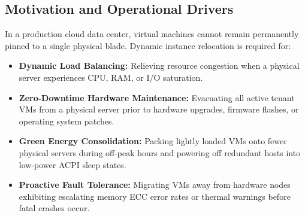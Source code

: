 \subsection{Motivation and Operational Drivers}
In a production cloud data center, virtual machines cannot remain permanently pinned to a single physical blade. Dynamic instance relocation is required for:
\begin{itemize}[leftmargin=*]
  \item \textbf{Dynamic Load Balancing:} Relieving resource congestion when a physical server experiences CPU, RAM, or I/O saturation.
  \item \textbf{Zero-Downtime Hardware Maintenance:} Evacuating all active tenant VMs from a physical server prior to hardware upgrades, firmware flashes, or operating system patches.
  \item \textbf{Green Energy Consolidation:} Packing lightly loaded VMs onto fewer physical servers during off-peak hours and powering off redundant hosts into low-power ACPI sleep states.
  \item \textbf{Proactive Fault Tolerance:} Migrating VMs away from hardware nodes exhibiting escalating memory ECC error rates or thermal warnings before fatal crashes occur.
\end{itemize}

